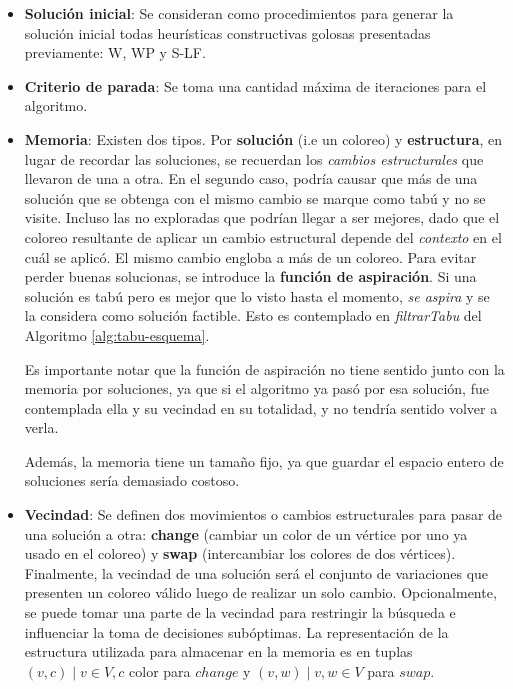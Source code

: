 \begin{itemize}
    \item \textbf{Solución inicial}: Se consideran como procedimientos para generar la solución inicial todas heurísticas constructivas golosas presentadas previamente: W, WP y S-LF.
    \item \textbf{Criterio de parada}: Se toma una cantidad máxima de iteraciones para el algoritmo.
    \item \textbf{Memoria}: Existen dos tipos. Por \textbf{solución} (i.e un coloreo) y \textbf{estructura}, en lugar de recordar las soluciones, se recuerdan los \textit{cambios estructurales} que llevaron de una a otra. En el segundo caso, podría causar que más de una solución que se obtenga con el mismo cambio se marque como tabú y no se visite. Incluso las no exploradas que podrían llegar a ser mejores, dado que el coloreo resultante de aplicar un cambio estructural depende del \textit{contexto} en el cuál se aplicó. El mismo cambio engloba a más de un coloreo. Para evitar perder buenas solucionas, se introduce la \textbf{función de aspiración}. Si una solución es tabú pero es mejor que lo visto hasta el momento, \textit{se aspira} y se la considera como solución factible. Esto es contemplado en \textit{filtrarTabu} del Algoritmo \ref{alg:tabu-esquema}.
    
    Es importante notar que la función de aspiración no tiene sentido junto con la memoria por soluciones, ya que si el algoritmo ya pasó por esa solución, fue contemplada ella y su vecindad en su totalidad, y no tendría sentido volver a verla.
    
    Además, la memoria tiene un tamaño fijo, ya que guardar el espacio entero de soluciones sería demasiado costoso.

    \item \textbf{Vecindad}: Se definen dos movimientos o cambios estructurales para pasar de una solución a otra: \textbf{change} (cambiar un color de un vértice por uno ya usado en el coloreo) y \textbf{swap} (intercambiar los colores de dos vértices). Finalmente, la vecindad de una solución será el conjunto de variaciones que presenten un coloreo válido luego de realizar un solo cambio. Opcionalmente, se puede tomar una parte de la vecindad para restringir la búsqueda e influenciar la toma de decisiones subóptimas. La representación de la estructura utilizada para almacenar en la memoria es en tuplas $(v, c) \mid v \in V, c$ color para $change$ y $(v, w) \mid v, w \in V$ para $swap$.
\end{itemize}

